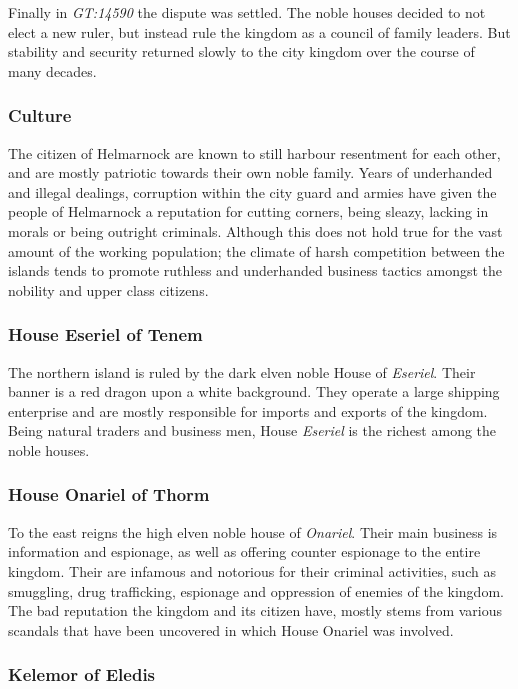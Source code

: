 Finally in \emph{GT:14590} the dispute was settled. The noble houses decided
to not elect a new ruler, but instead rule the kingdom as a council of family
leaders. But stability and security returned slowly to the city kingdom over
the course of many decades.

\subsubsection*{Culture}

The citizen of Helmarnock are known to still harbour resentment for each other,
and are mostly patriotic towards their own noble family. Years of underhanded
and illegal dealings, corruption within the city guard and armies have given
the people of Helmarnock a reputation for cutting corners, being sleazy,
lacking in morals or being outright criminals. Although this does not hold
true for the vast amount of the working population; the climate of harsh
competition between the islands tends to promote ruthless and underhanded
business tactics amongst the nobility and upper class citizens.

\subsubsection*{House Eseriel of Tenem}

The northern island is ruled by the dark elven noble House of \emph{Eseriel}.
Their banner is a red dragon upon a white background. They operate a large
shipping enterprise and are mostly responsible for imports and exports of
the kingdom. Being natural traders and business men, House \emph{Eseriel}
is the richest among the noble houses.

\subsubsection*{House Onariel of Thorm}

To the east reigns the high elven noble house of \emph{Onariel}. Their main
business is information and espionage, as well as offering counter espionage
to the entire kingdom. Their are infamous and notorious for their criminal
activities, such as smuggling, drug trafficking, espionage and oppression
of enemies of the kingdom. The bad reputation the kingdom and its citizen
have, mostly stems from various scandals that have been uncovered in which
House Onariel was involved.

\subsubsection*{Kelemor of Eledis}

